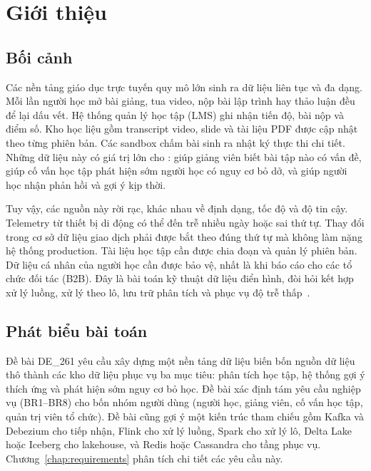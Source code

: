 \chapter{Giới thiệu}
\label{chap:intro}

\section{Bối cảnh}

Các nền tảng giáo dục trực tuyến quy mô lớn sinh ra dữ liệu liên tục và đa dạng. Mỗi lần người học mở bài giảng, tua video, nộp bài lập trình hay thảo luận đều để lại dấu vết. Hệ thống quản lý học tập (LMS) ghi nhận tiến độ, bài nộp và điểm số. Kho học liệu gồm transcript video, slide và tài liệu PDF được cập nhật theo từng phiên bản. Các sandbox chấm bài sinh ra nhật ký thực thi chi tiết. Những dữ liệu này có giá trị lớn cho : giúp giảng viên biết bài tập nào có vấn đề, giúp cố vấn học tập phát hiện sớm người học có nguy cơ bỏ dở, và giúp người học nhận phản hồi và gợi ý kịp thời.

Tuy vậy, các nguồn này rời rạc, khác nhau về định dạng, tốc độ và độ tin cậy. Telemetry từ thiết bị di động có thể đến trễ nhiều ngày hoặc sai thứ tự. Thay đổi trong cơ sở dữ liệu giao dịch phải được bắt theo đúng thứ tự mà không làm nặng hệ thống production. Tài liệu học tập cần được chia đoạn và quản lý phiên bản. Dữ liệu cá nhân của người học cần được bảo vệ, nhất là khi báo cáo cho các tổ chức đối tác (B2B). Đây là bài toán kỹ thuật dữ liệu điển hình, đòi hỏi kết hợp xử lý luồng, xử lý theo lô, lưu trữ phân tích và phục vụ độ trễ thấp~\cite{kleppmann2017}.

\section{Phát biểu bài toán}

Đề bài DE\_261 yêu cầu xây dựng một nền tảng dữ liệu biến bốn nguồn dữ liệu thô thành các kho dữ liệu phục vụ ba mục tiêu: phân tích học tập, hệ thống gợi ý thích ứng và phát hiện sớm nguy cơ bỏ học. Đề bài xác định tám yêu cầu nghiệp vụ (BR1--BR8) cho bốn nhóm người dùng (người học, giảng viên, cố vấn học tập, quản trị viên tổ chức). Đề bài cũng gợi ý một kiến trúc tham chiếu gồm Kafka và Debezium cho tiếp nhận, Flink cho xử lý luồng, Spark cho xử lý lô, Delta Lake hoặc Iceberg cho lakehouse, và Redis hoặc Cassandra cho tầng phục vụ. Chương~\ref{chap:requirements} phân tích chi tiết các yêu cầu này.

